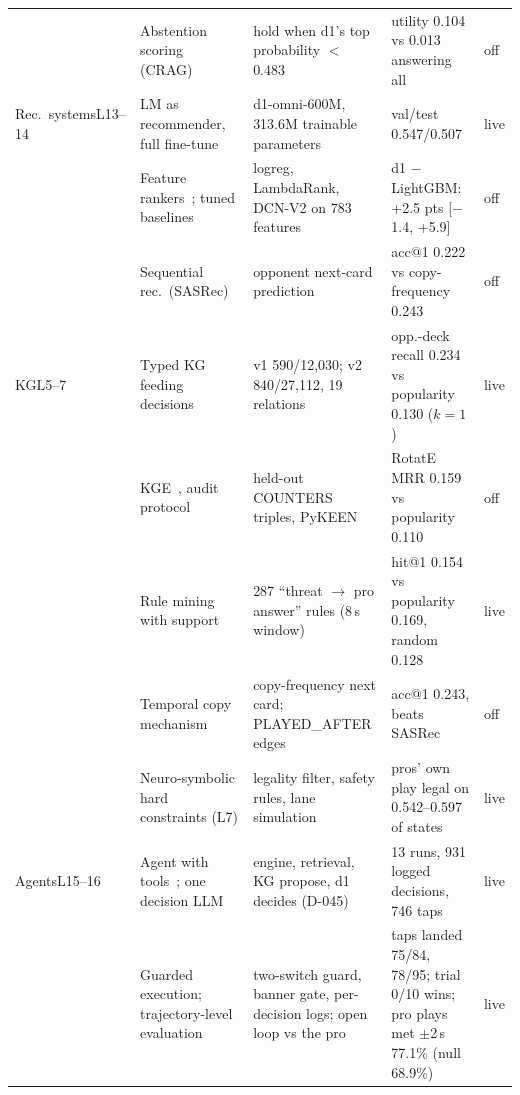 \documentclass[conference]{IEEEtran}
\begin{document}
\begin{table}[t]
\begin{tabular}{@{}L{2.0cm}L{4.1cm}L{4.95cm}L{5.0cm}l@{}}
 & Abstention scoring (CRAG)~\cite{yang2024cragbench} & hold when d1's top probability $<$ 0.483 & utility 0.104 vs 0.013 answering all & off\\
Rec.\ systems\newline L13--14~\cite{lim2026l13,lim2026l14}
 & LM as recommender, full fine-tune~\cite{bao2023tallrec,geng2022p5} & d1-omni-600M, 313.6M trainable parameters & val/test 0.547/0.507 & live\\
 & Feature rankers~\cite{wang2021dcnv2,burges2010lambdamart}; tuned baselines~\cite{rendle2020ncfvsmf} & logreg, LambdaRank, DCN-V2 on 783 features & d1 $-$ LightGBM: +2.5 pts [$-$1.4, +5.9] & off\\
 & Sequential rec.\ (SASRec)~\cite{kang2018sasrec} & opponent next-card prediction & acc@1 0.222 vs copy-frequency 0.243 & off\\
KG\newline L5--7~\cite{cap6938L05,cap6938L06C,cap6938L07}
 & Typed KG feeding decisions & v1 590/12,030; v2 840/27,112, 19 relations & opp.-deck recall 0.234 vs popularity 0.130 ($k{=}1$) & live\\
 & KGE~\cite{bordes2013transe,yang2015distmult,trouillon2016complex,sun2019rotate}, audit protocol~\cite{ruffinelli2020olddog,sun2020reevaluation} & held-out COUNTERS triples, PyKEEN~\cite{ali2021pykeen} & RotatE MRR 0.159 vs popularity 0.110 & off\\
 & Rule mining with support~\cite{lajus2020amie3,liu2022tlogic} & 287 ``threat $\rightarrow$ pro answer'' rules (8\,s window) & hit@1 0.154 vs popularity 0.169, random 0.128 & live\\
 & Temporal copy mechanism~\cite{zhu2021cygnet} & copy-frequency next card; PLAYED\_AFTER edges & acc@1 0.243, beats SASRec & off\\
 & Neuro-symbolic hard constraints (L7) & legality filter, safety rules, lane simulation & pros' own play legal on 0.542--0.597 of states & live\\
Agents\newline L15--16~\cite{lim2026l15,lim2026l16}
 & Agent with tools~\cite{yao2023react}; one decision LLM & engine, retrieval, KG propose, d1 decides (D-045) & 13 runs, 931 logged decisions, 746 taps & live\\
 & Guarded execution; trajectory-level evaluation~\cite{yao2025taubench} & two-switch guard, banner gate, per-decision logs; open loop vs the pro & taps landed 75/84, 78/95; trial 0/10 wins; pro plays met $\pm$2\,s 77.1\% (null 68.9\%) & live\\

\end{tabular}
\end{table}
\end{document}
